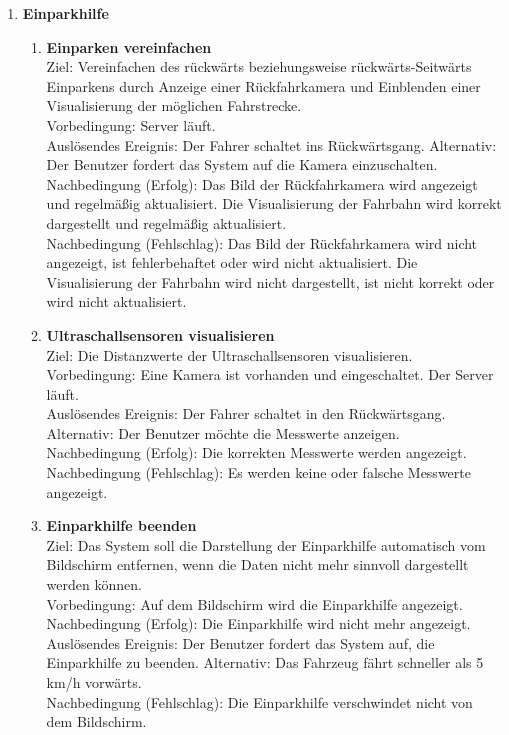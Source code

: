 \documentclass[pflichtenheft.tex]{subfiles}
\begin{document}
\begin{enumerate}
	\item{\textbf{Einparkhilfe}}
	
	\begin{enumerate}

	\item{\textbf{Einparken vereinfachen}} \\ Ziel: Vereinfachen des rückwärts beziehungsweise rückwärts-Seitwärts Einparkens durch Anzeige einer Rückfahrkamera und Einblenden einer Visualisierung der möglichen Fahrstrecke. \\ Vorbedingung: Server läuft. \\ Auslösendes Ereignis:  Der Fahrer schaltet ins Rückwärtsgang. Alternativ: Der Benutzer fordert das System auf die Kamera einzuschalten. \\ Nachbedingung (Erfolg): Das Bild der Rückfahrkamera wird angezeigt und regelmäßig aktualisiert. Die Visualisierung der Fahrbahn wird korrekt dargestellt und regelmäßig aktualisiert. \\ Nachbedingung (Fehlschlag): Das Bild der Rückfahrkamera wird nicht angezeigt, ist fehlerbehaftet oder wird nicht aktualisiert. Die Visualisierung der Fahrbahn wird nicht dargestellt, ist nicht korrekt oder wird nicht aktualisiert. 

	\item{\textbf{Ultraschallsensoren visualisieren}} \\ Ziel: Die Distanzwerte der Ultraschallsensoren visualisieren. \\ Vorbedingung: Eine Kamera ist vorhanden und eingeschaltet. Der Server läuft. \\ Auslösendes Ereignis: Der Fahrer schaltet in den Rückwärtsgang. Alternativ: Der Benutzer möchte die Messwerte anzeigen.\\ Nachbedingung (Erfolg): Die korrekten Messwerte werden angezeigt. \\ Nachbedingung (Fehlschlag): Es werden keine oder falsche Messwerte angezeigt.

	\item{\textbf{Einparkhilfe beenden}} \\ Ziel: Das System soll die Darstellung der Einparkhilfe automatisch vom Bildschirm entfernen, wenn die Daten nicht mehr sinnvoll dargestellt werden können. \\ Vorbedingung: Auf dem Bildschirm wird die Einparkhilfe angezeigt. \\ Nachbedingung (Erfolg): Die Einparkhilfe wird nicht mehr angezeigt. \\ Auslösendes Ereignis: Der Benutzer fordert das System auf, die Einparkhilfe zu beenden. Alternativ: Das Fahrzeug fährt schneller als 5 km/h vorwärts. \\  Nachbedingung (Fehlschlag): Die Einparkhilfe verschwindet nicht von dem Bildschirm.


\end{enumerate}
\end{enumerate}
\end{document}

